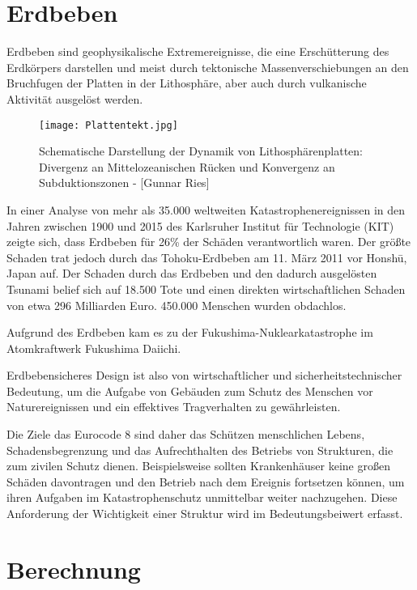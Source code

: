 \section{Erdbeben}
\label{sec:erdbeben}

Erdbeben sind geophysikalische Extremereignisse, die eine Erschütterung des Erdkörpers darstellen und meist durch tektonische Massenverschiebungen an den Bruchfugen der Platten in der Lithosphäre, aber auch durch vulkanische Aktivität ausgelöst werden. \cite{ETHZ}

\begin{figure}[ht]
    \centering
    \texttt{[image: Plattentekt.jpg]}
    \caption{Schematische Darstellung der Dynamik von Lithosphärenplatten: Divergenz an Mittelozeanischen Rücken und Konvergenz an Subduktionszonen - [Gunnar Ries]}
\end{figure}

In einer Analyse von mehr als 35.000 weltweiten Katastrophenereignissen in den Jahren zwischen 1900 und 2015 des Karlsruher Institut für Technologie (KIT) zeigte sich, dass Erdbeben für 26\% der Schäden verantwortlich waren.
Der größte Schaden trat jedoch durch das Tohoku-Erdbeben am 11. März 2011 vor Honshū, Japan auf. Der Schaden durch das Erdbeben und den dadurch ausgelösten Tsunami belief sich auf 18.500 Tote und einen direkten wirtschaftlichen Schaden von etwa 296 Milliarden Euro. 450.000 Menschen wurden obdachlos. \cite{DANIELL}

Aufgrund des Erdbeben kam es zu der Fukushima-Nuklearkatastrophe im Atomkraftwerk Fukushima Daiichi.

Erdbebensicheres Design ist also von wirtschaftlicher und sicherheitstechnischer Bedeutung, um die Aufgabe von Gebäuden zum Schutz des Menschen vor Naturereignissen und ein effektives Tragverhalten zu gewährleisten.

Die Ziele das Eurocode 8 sind daher das Schützen menschlichen Lebens, Schadensbegrenzung und das Aufrechthalten des Betriebs von Strukturen, die zum zivilen Schutz dienen. Beispielsweise sollten Krankenhäuser keine großen Schäden davontragen und den Betrieb nach dem Ereignis fortsetzen können, um ihren Aufgaben im Katastrophenschutz unmittelbar weiter nachzugehen.
Diese Anforderung der Wichtigkeit einer Struktur wird im Bedeutungsbeiwert erfasst. \cite{EC8}

\section{Berechnung}
\label{sec:berechnung}

